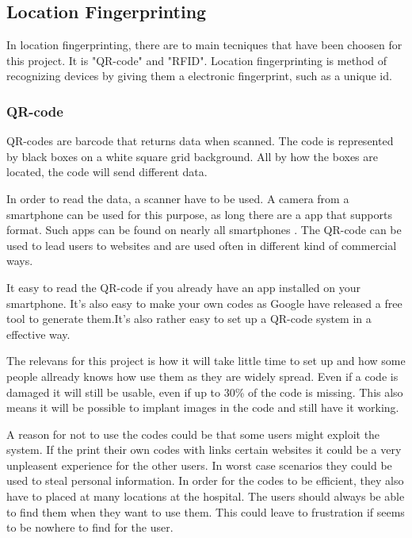 \subsection{Location Fingerprinting}
In location fingerprinting, there are to main tecniques that have been choosen for this project. It is "QR-code" and "RFID".
Location fingerprinting is method of recognizing devices by giving them a electronic fingerprint, such as a unique id.

\subsubsection{QR-code} %


QR-codes are barcode that returns data when scanned. The code is represented by black boxes on a white square grid background. All by how the boxes are located, the code will send different data.

In order to read the data, a scanner have to be used. A camera from a smartphone can be used for this purpose, as long there are a app that supports format. Such apps can be found on nearly all smartphones \cite{QR_smart}. The QR-code can be used to lead users to websites and are used often in different kind of commercial ways\cite{QR_url}.

It easy to read the QR-code if you already have an app installed on your smartphone. It's also easy to make your own codes as Google have released a free tool to generate them\cite{QR_Google}.It's also rather easy to set up a QR-code system in a effective way\cite{QR_easy}.

The relevans for this project is how it will take little time to set up\cite{QR_rel1} and how some people allready knows how use them as they are widely spread\cite{QR_spread}. Even if a code is damaged it will still be usable, even if up to 30\% of the code is missing\cite{QR_dama}. This also means it will be possible to implant images in the code and still have it working\cite{QR_image}.

A reason for not to use the codes could be that some users might exploit the system. If the print their own codes with links certain websites it could be a very unpleasent experience for the other users\cite{QR_urlbad}. In worst case scenarios they could be used to steal personal information\cite{QR_information}.
In order for the codes to be efficient, they also have to placed at many locations at the hospital. The users should always be able to find them when they want to use them. This could leave to frustration if seems to be nowhere to find for the user.


